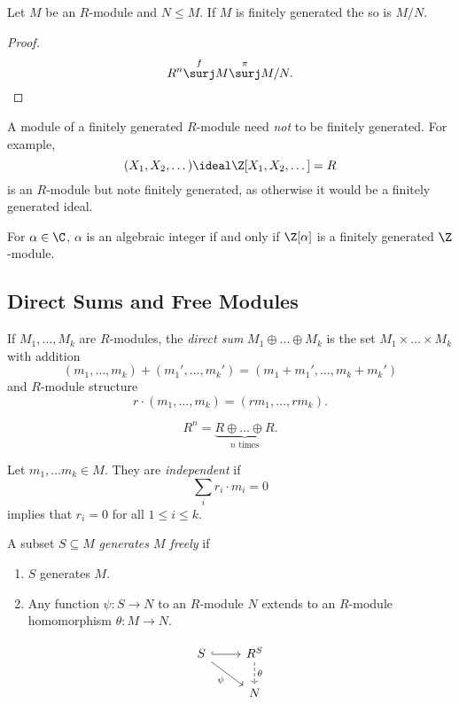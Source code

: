 \documentclass[a4paper]{article}
\theoremstyle{definition}
\begin{document}
\begin{corollary}
  Let \(M\) be an \(R\)-module and \(N \leq M\). If \(M\) is finitely generated the so is \(M/N\).
\end{corollary}

\begin{proof}
  \[
    R^n \overset{f}{\surj} M \overset{\pi}{\surj} M/N.
  \]
\end{proof}

\begin{note}
  A module of a finitely generated \(R\)-module need \emph{not} to be finitely generated. For example,
  \[
    (X_1, X_2, \dots) \ideal \Z[X_1, X_2, \dots] = R
  \]
  is an \(R\)-module but note finitely generated, as otherwise it would be a finitely generated ideal.
\end{note}

\begin{eg}
  For \(\alpha \in \C\), \(\alpha\) is an algebraic integer if and only if \(\Z[\alpha]\) is a finitely generated \(\Z\)-module.
\end{eg}

\subsection{Direct Sums and Free Modules}

\begin{definition}
  If \(M_1, \dots, M_k\) are \(R\)-modules, the \emph{direct sum} \(M_1 \oplus \dots \oplus M_k\) is the set \(M_1 \times \dots \times M_k\) with addition
  \[
    (m_1, \dots, m_k) + (m_1', \dots, m_k') = (m_1 + m_1', \dots, m_k + m_k')
  \]
  and \(R\)-module structure
  \[
    r \cdot (m_1, \dots, m_k) = (rm_1, \dots, rm_k).
  \]
\end{definition}

\begin{eg}
  \[
    R^n = \underbrace{R \oplus \dots \oplus R}_{n \text{ times}}.
  \]
\end{eg}

\begin{definition}[Independence]
  Let \(m_1, \dots m_k \in M\). They are \emph{independent} if
  \[
    \sum_i r_i \cdot m_i = 0
  \]
  implies that \(r_i = 0\) for all \(1 \leq i \leq k\).
\end{definition}

\begin{definition}
  A subset \(S \subseteq M\) \emph{generates \(M\) freely} if
    \begin{enumerate}
    \item \(S\) generates \(M\).
    \item Any function \(\psi: S \to N\) to an \(R\)-module \(N\) extends to an \(R\)-module homomorphism \(\theta: M \to N\).
    \end{enumerate}
    \[
      \begin{tikzcd}
        S \ar[r, hook] \ar[dr, "\psi"'] & R^S \ar[d, dashed, "\theta"] \\
        & N
      \end{tikzcd}
    \]
\end{definition}
\end{document}
